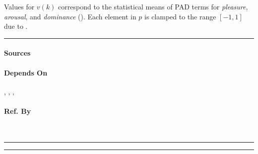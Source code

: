 Values for $v\left(k\right)$ correspond to the statistical means of PAD terms
for \textit{pleasure}, \textit{arousal}, and \textit{dominance}
(). Each element in $p$ is clamped to the range
$\left[-1, 1\right]$ due to . \\\hrule

\paragraph{Sources} \citet[p.~42--45]{mehrabian1980basic}

\paragraph{Depends On} , ,
, 

\paragraph{Ref. By}  \\\hrule\vspace{0.5mm}\hrule